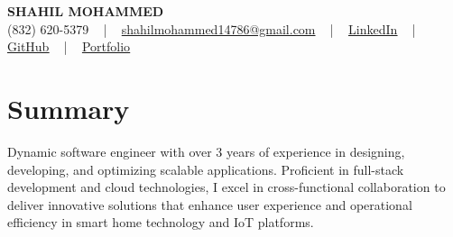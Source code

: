 \documentclass[letterpaper,10pt]{article}
\begin{document}
\begin{center}
    {\fontsize{14pt}{12pt}\selectfont \textbf{\MakeUppercase{Shahil Mohammed}}}\\ \vspace{2pt}
    \fontsize{10pt}{12pt}\selectfont (832) 620-5379 ~ | ~ \href{mailto:shahilmohammed14786@gmail.com}{shahilmohammed14786@gmail.com} ~ | ~  
    \href{https://www.linkedin.com/in/shahil-mohammed-9652931a1/}{\color{blue}\underline{LinkedIn}}  ~ | ~ 
    \href{https://github.com/freakbeast14}{\color{blue}\underline{GitHub}} ~ | ~ 
    \href{https://shahil-mohammed.netlify.app/}{\color{blue}\underline{Portfolio}}
    \vspace{-8pt}
\end{center}

\section{Summary}
\vspace{-2pt}\fontsize{8pt}{9pt}\selectfont
Dynamic software engineer with over 3 years of experience in designing, developing, and optimizing scalable applications. Proficient in full-stack development and cloud technologies, I excel in cross-functional collaboration to deliver innovative solutions that enhance user experience and operational efficiency in smart home technology and IoT platforms.
 \vspace{-5pt}
 
\vspace{-2pt}
\end{document}
